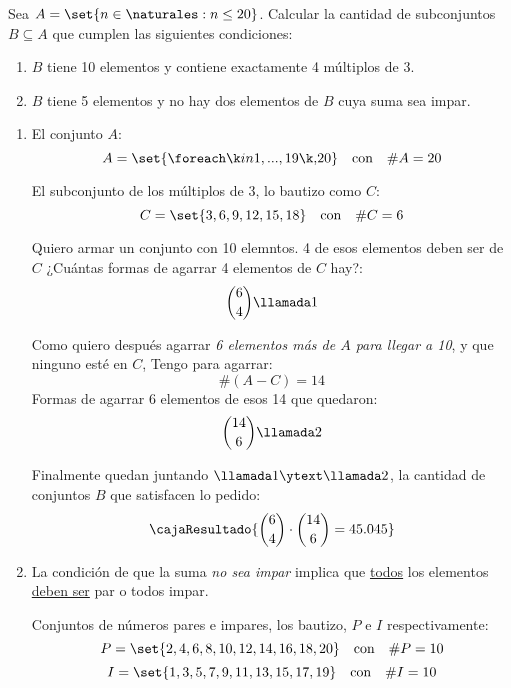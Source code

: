 \def\enumeracion{\roman*)}

\begin{enunciado}{\ejercicio}
  Sea $A = \set{n \in \naturales : n \leq 20}$.
  Calcular la cantidad de subconjuntos $B \subseteq A$ que cumplen
  las siguientes condiciones:
  \begin{enumerate}[label=\enumeracion]
    \item $B$ tiene 10 elementos y contiene exactamente 4 múltiplos de 3.

    \item $B$ tiene 5 elementos y no hay dos elementos de $B$ cuya suma sea impar.
  \end{enumerate}

\end{enunciado}

\begin{enumerate}[label=\enumeracion]
  \item
        El conjunto $A$:
        $$
          A = \set{\foreach \k in {1,...,19}{\k, }20}
          \quad \text{con} \quad
          \#A = 20
        $$

        El subconjunto de los múltiplos de 3, lo bautizo como $C$:
        $$
          C = \set{3, 6, 9, 12, 15, 18}
          \quad \text{con} \quad
          \#C = 6
        $$

        Quiero armar un conjunto con 10 elemntos. 4 de esos elementos deben ser de $C$
        ¿Cuántas formas de agarrar 4 elementos de $C$ hay?:
        $$
          \binom{6}{4} \llamada1
        $$

        Como quiero después agarrar \textit{6 elementos más de $A$ para llegar a 10}, y que ninguno esté en $C$,
        Tengo para agarrar:
        $$
          \#(A-C) =  14
        $$
        Formas de agarrar 6 elementos de esos 14 que quedaron:
        $$
          \binom{14}{6} \llamada2
        $$

        Finalmente quedan juntando $\llamada1 \ytext \llamada2$, la cantidad de conjuntos $B$ que satisfacen lo pedido:
        $$
          \cajaResultado{
            \binom{6}{4} \cdot \binom{14}{6} = 45.045
          }
        $$

  \item
        La condición de que la suma \textit{no sea impar} implica que \underline{todos} los elementos
        \underline{deben ser} par o todos impar.

        Conjuntos de números pares e impares, los bautizo, $P$ e $I$ respectivamente:
        $$
          P = \set{2,4,6,8,10,12,14,16,18, 20}
          \quad \text{con} \quad
          \#P = 10
        $$
        $$
          I = \set{1,3,5,7,9,11,13,15,17,19}
          \quad \text{con} \quad
          \#I = 10
        $$


\end{enumerate}

